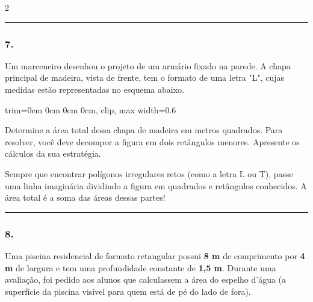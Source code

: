 \documentclass[twoside, 10pt, a4paper]{article}
\newlength{\espacoPreQuestao}\setlength{\espacoPreQuestao}{0.1cm}
\newlength{\espacoQuestao}\setlength{\espacoQuestao}{0.2cm}
\begin{document}
\begin{multicols*}{2}
\noindent\textcolor{CorLinha}{\rule{\linewidth}{0.5pt}} 
\par\vspace{\espacoPreQuestao}
\subsubsection*{7.} Um marceneiro desenhou o projeto de um armário fixado na parede. A chapa principal de madeira, vista de frente, tem o formato de uma letra "L", cujas medidas estão representadas no esquema abaixo.

\begin{center}
\begin{adjustbox}{trim=0cm 0cm 0cm 0cm, clip, max width=0.6\linewidth}
\end{adjustbox}
\end{center}

Determine a área total dessa chapa de madeira em metros quadrados. Para resolver, você deve decompor a figura em dois retângulos menores. Apresente os cálculos da sua estratégia.
\par\vspace{\espacoQuestao}

\begin{boxdica}
Sempre que encontrar polígonos irregulares retos (como a letra L ou T), passe uma linha imaginária dividindo a figura em quadrados e retângulos conhecidos. A área total é a soma das áreas dessas partes!
\end{boxdica}

\noindent\textcolor{CorLinha}{\rule{\linewidth}{0.5pt}} 
\par\vspace{\espacoPreQuestao}
\subsubsection*{8.} Uma piscina residencial de formato retangular possui \textbf{8 m} de comprimento por \textbf{4 m} de largura e tem uma profundidade constante de \textbf{1,5 m}. Durante uma avaliação, foi pedido aos alunos que calculassem a área do espelho d'água (a superfície da piscina visível para quem está de pé do lado de fora). 


\end{multicols*}
\end{document}
